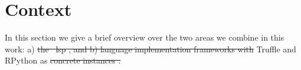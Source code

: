 \documentclass[sigplan,10pt,review,anonymous]{acmart}
\providecommand{\DIFdel}[1]{{\protect\color{red}\sout{#1}}}                      %
\providecommand{\DIFdelbegin}{} %
\providecommand{\DIFdelend}{} %
\begin{document}
\section{Context}
\label{cha:context}

In this section we give a brief overview over the two areas we combine in this
work: a) \DIFdelbegin \DIFdel{the \mbox{%
\acf{lsp}}\hspace{0pt}%
, and b) language implementation frameworks with }\DIFdelend Truffle and RPython as \DIFdelbegin \DIFdel{concrete instances .
}%

\end{document}
